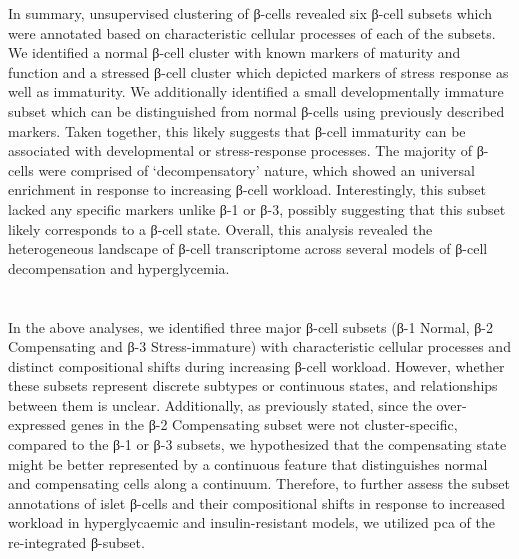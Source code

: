 In summary, unsupervised clustering of β-cells revealed six β-cell subsets which were annotated based on characteristic cellular processes of each of the subsets. We identified a normal β-cell cluster with known markers of maturity and function and a stressed β-cell cluster which depicted markers of stress response as well as immaturity. We additionally identified a small developmentally immature subset which can be distinguished from normal β-cells using previously described markers. Taken together, this likely suggests that β-cell immaturity can be associated with developmental or stress-response processes. The majority of β-cells were comprised of `decompensatory' nature, which showed an universal enrichment in response to increasing β-cell workload. Interestingly, this subset lacked any specific markers unlike β-1 or β-3, possibly suggesting that this subset likely corresponds to a β-cell state. Overall, this analysis revealed the heterogeneous landscape of β-cell transcriptome across several models of β-cell decompensation and hyperglycemia. 

\clearpage

\section{}
\label{sec:chp3_betaPCA}
In the above analyses, we identified three major β-cell subsets (β-1 Normal, β-2 Compensating and β-3 Stress-immature) with characteristic cellular processes and distinct compositional shifts during increasing β-cell workload. However, whether these subsets represent discrete subtypes or continuous states, and relationships between them is unclear. Additionally, as previously stated, since the over-expressed genes in the β-2 Compensating subset were not cluster-specific, compared to the β-1 or β-3 subsets, we hypothesized that the compensating state might be better represented by a continuous feature that distinguishes normal and compensating cells along a continuum. Therefore, to further assess the subset annotations of islet β-cells and their compositional shifts in response to increased workload in hyperglycaemic and insulin-resistant models, we utilized \gls{pca} of the re-integrated β-subset.\\


